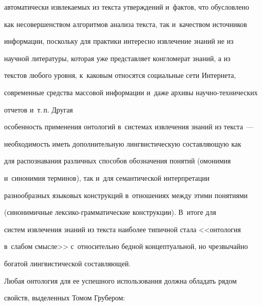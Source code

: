 автоматически извлекаемых из текста утверждений и~фактов, что обусловлено 


как несовершенством алгоритмов анализа текста, так и~качеством источников 


информации, поскольку для практики интересно извлечение знаний не из 


научной литературы, которая уже представляет конгломерат знаний, а из 


текстов любого уровня, к~каковым относятся социальные сети Интернета, 


современные средства массовой информации и~даже архивы на\-уч\-но-тех\-ни\-че\-ских 


отчетов и~т.\,п. Другая 


особенность применения онтологий в~системах извлечения знаний из текста~--- 


необходимость иметь дополнительную лингвистическую со\-став\-ля\-ющую как 


для распознавания различных способов обозначения понятий (омонимия 


и~синонимия терминов), так и~для семантической интерпретации 


разнообразных языковых конструкций в~отношениях между этими понятиями 


(синонимичные лек\-си\-ко-грам\-ма\-ти\-че\-ские конструкции). В~итоге для 


систем извлечения знаний из текста наиболее типичной стала <<онтология 


в~слабом смысле>> с~относительно бедной концептуальной, но чрезвычайно 


богатой лингвистической составляющей.


  


  Любая онтология для ее успешного использования должна обладать рядом 


свойств, выделенных Томом Грубером:


